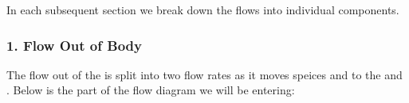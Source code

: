 \documentclass[letterpaper,10pt,english]{sphinxmanual}
\begin{document}
\begin{figure}[htbp]
\centering

\noindent{}
\end{figure}

\sphinxAtStartPar
In each subsequent section we break down the flows into individual components.


\subsubsection{1. Flow Out of Body}
\label{\detokenize{pages/tutorial_mc/addIO:flow-out-of-body}}
\sphinxAtStartPar
The flow out of the  is split into two flow rates as it moves
speices  and  to the  and .  Below is the
part of the flow diagram we will be entering:
\end{document}
